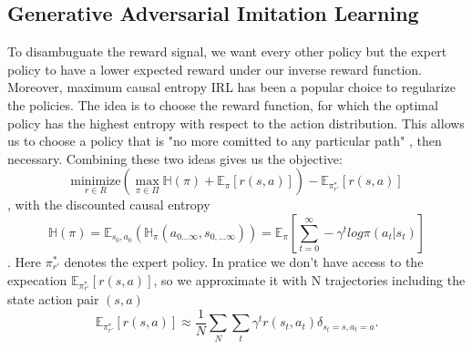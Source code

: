 \subsection{Generative Adversarial Imitation Learning}
To disambuguate the reward signal, we want every other policy but the expert policy to have a lower expected reward under our inverse reward function. Moreover, 
maximum causal entropy IRL \cite{max_cause_ent_IRL} has been a popular choice to regularize the policies. The idea is to choose the reward function, for 
which the optimal policy has the highest entropy with respect to the action distribution. This allows us to choose a policy that is "no more comitted to any 
particular path" \cite[p.2]{max_cause_ent_IRL}, then necessary. Combining these two ideas gives us the objective:
\begin{equation}
    \underset{r \in R}{\text{minimize}} \left( \max_{\pi \in \Pi} \mathbb{H}(\pi) + \mathbb{E}_{\pi}[r(s, a)] \right) - \mathbb{E}_{\pi_{r'}^*}[r(s,a)]
\end{equation}
, with the discounted causal entropy 
\begin{equation}
    \mathbb{H}(\pi) = \mathbb{E}_{s_0, a_0} \left(\mathbb{H}_{\pi}(a_{0...\infty}, s_{0,...\infty})\right) = \mathbb{E}_{\pi}\left[\sum_{t=0}^\infty -\gamma^t log \pi(a_t|s_t)\right]
\end{equation}
\cite{InfCausalEnt}. Here $\pi_{r'}^*$ denotes the expert policy. In pratice we don't have access to the expecation $\mathbb{E}_{\pi_{r'}^*}[r(s,a)]$, so we approximate it with N 
trajectories including the state action pair $(s,a)$
\begin{equation}
    \mathbb{E}_{\pi_{r'}^*}[r(s,a)] \approx \frac{1}{N} \sum_N \sum_t \gamma^t r(s_t,a_t) \delta_{s_t=s, a_t=a}.
\end{equation}


